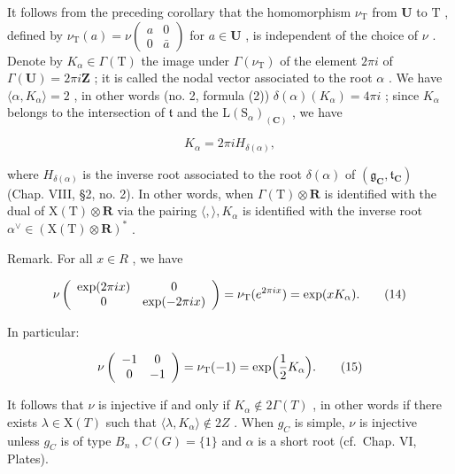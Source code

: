 It follows from the preceding corollary that the homomorphism \(\nu_{\mathrm{T}}\) from \(\mathbf{U}\) to \(\mathrm{T}\) , defined by \(\nu_{\mathrm{T}}(a) = \nu \left( \begin{array}{cc}a & 0\\ 0 & \bar{a} \end{array} \right)\) for \(a\in \mathbf{U}\) , is independent of the choice of \(\nu\) . Denote by \(K_{\alpha}\in \Gamma (\mathrm{T})\) the image under \(\Gamma (\nu_{\mathrm{T}})\) of the element \(2\pi i\) of \(\Gamma (\mathbf{U}) = 2\pi i\mathbf{Z}\) ; it is called the nodal vector associated to the root \(\alpha\) . We have \(\langle \alpha ,K_{\alpha}\rangle = 2\) , in other words (no. 2, formula (2)) \(\delta (\alpha)(K_{\alpha}) = 4\pi i\) ; since \(K_{\alpha}\) belongs to the intersection of \(\mathfrak{t}\) and the \(\mathrm{L}(\mathrm{S}_{\alpha})_{(\mathbf{C})}\) , we have

\[
K _ {\alpha} = 2 \pi i H _ {\delta (\alpha)},\tag{13}
\]

where \(H_{\delta(\alpha)}\) is the inverse root associated to the root \(\delta(\alpha)\) of \((\mathfrak{g}_{\mathbf{C}}, \mathfrak{t}_{\mathbf{C}})\) (Chap. VIII, §2, no. 2). In other words, when \(\Gamma(\mathrm{T}) \otimes \mathbf{R}\) is identified with the dual of \(\mathrm{X(T)}\otimes \mathbf{R}\) via the pairing \(\langle ,\rangle ,K_{\alpha}\) is identified with the inverse root \(\alpha^{\vee}\in (\mathrm{X(T)}\otimes \mathbf{R})^{*}\) .

Remark. For all \(x \in R\) , we have

\[
\nu \left( \begin{array}{c c} \exp (2 \pi i x) & 0 \\ 0 & \exp (- 2 \pi i x) \end{array} \right) = \nu_ {\mathrm{T}} (e ^ {2 \pi i x}) = \exp (x K _ {\alpha}).\tag{14}
\]

In particular:

\[
\nu \left( \begin{array}{c c} - 1 & 0 \\ 0 & - 1 \end{array} \right) = \nu_ {\mathrm{T}} (- 1) = \exp \Bigl (\frac {1}{2} K _ {\alpha} \Bigr).\tag{15}
\]

It follows that \(\nu\) is injective if and only if \(K_{\alpha} \notin 2\Gamma(T)\) , in other words if there exists \(\lambda \in \mathrm{X}(T)\) such that \(\langle \lambda, K_{\alpha} \rangle \notin 2Z\) . When \(g_{C}\) is simple, \(\nu\) is injective unless \(g_{C}\) is of type \(B_{n}\) , \(C(G) = \{1\}\) and \(\alpha\) is a short root (cf.~Chap. VI, Plates).

